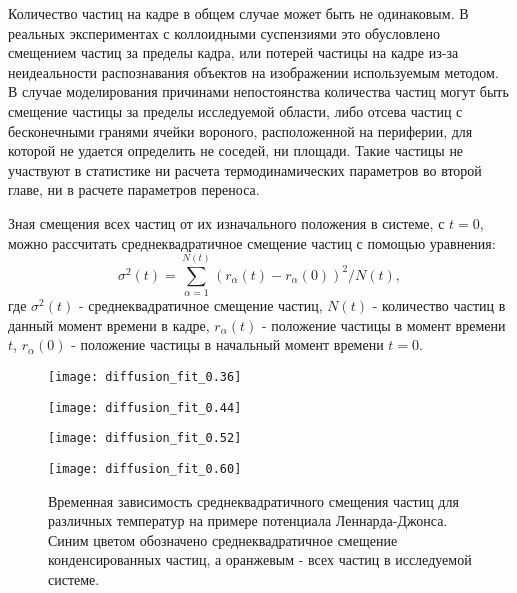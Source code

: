 Количество частиц на кадре в общем случае может быть не одинаковым. В реальных экспериментах с коллоидными суспензиями это обусловлено смещением частиц за пределы кадра, или потерей частицы на кадре из-за неидеальности распознавания объектов на изображении используемым методом. В случае моделирования причинами непостоянства количества частиц могут быть смещение частицы за пределы исследуемой области, либо отсева частиц с бесконечными гранями ячейки вороного, расположенной на периферии, для которой не удается определить не соседей, ни площади. Такие частицы не участвуют в статистике ни расчета термодинамических параметров во второй главе, ни в расчете параметров переноса. 

Зная смещения всех частиц от их изначального положения в системе, с $t = 0$, можно рассчитать среднеквадратичное смещение частиц с помощью уравнения:
\begin{equation}
    \sigma^2(t) = \sum\limits_{\alpha = 1}^{N(t)} (r_{\alpha}(t) - r_{\alpha}(0))^2 / N(t),
    \label{eqRMS}
\end{equation}
где $\sigma^2(t)$ - среднеквадратичное смещение частиц, $N(t)$ - количество частиц в данный момент времени в кадре, $r_{\alpha}(t)$ - положение частицы в момент времени $t$, $r_{\alpha}(0)$ - положение частицы в начальный момент времени $t = 0$.

\begin{figure}[h]
\begin{center}
\begin{minipage}[h]{0.45\linewidth}
\texttt{[image: diffusion\_fit\_0.36]}
\end{minipage}
\begin{minipage}[h]{0.45\linewidth}
\texttt{[image: diffusion\_fit\_0.44]}
\end{minipage}

\begin{minipage}[h]{0.45\linewidth}
\texttt{[image: diffusion\_fit\_0.52]}
\end{minipage}
\begin{minipage}[h]{0.45\linewidth}
\texttt{[image: diffusion\_fit\_0.60]}
\end{minipage}
\caption{Временная зависимость среднеквадратичного смещения частиц для различных температур на примере потенциала Леннарда-Джонса. Синим цветом обозначено среднеквадратичное смещение конденсированных частиц,  а оранжевым - всех частиц в исследуемой системе.}
\label{risRMS}
\end{center}
\end{figure}

